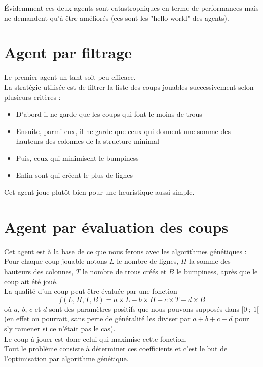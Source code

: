 Évidemment ces deux agents sont catastrophiques en terme de performances mais ne demandent qu'à être améliorés (ces sont les "hello world" des agents).

\section{Agent par filtrage}
Le premier agent un tant soit peu efficace.\\
La stratégie utilisée est de filtrer la liste des coups jouables successivement selon plusieurs critères :
\begin{itemize}
	\item D'abord il ne garde que les coups qui font le moins de trous
	\item Ensuite, parmi eux, il ne garde que ceux qui donnent une somme des hauteurs des colonnes de la structure minimal
	\item Puis, ceux qui minimisent le bumpiness
	\item Enfin sont qui créent le plus de lignes 
\end{itemize} 

Cet agent joue plutôt bien pour une heuristique aussi simple.

\section{Agent par évaluation des coups}
Cet agent est à la base de ce que nous ferons avec les algorithmes génétiques :\\
Pour chaque coup jouable notons $L$ le nombre de lignes, $H$ la somme des hauteurs des colonnes, $T$ le nombre de trous créés et $B$ le bumpiness, après que le coup ait été joué.\\
La qualité d'un coup peut être évaluée par une fonction $$f(L,H,T,B)=a\times L - b\times H - c\times T - d\times B$$
où $a$, $b$, $c$ et $d$ sont des paramètres positifs que nous pouvons supposés dans $[0~;~1[$ (en effet on pourrait, sans perte de généralité les diviser par $a+b+c+d$ pour s'y ramener si ce n'était pas le cas).\\

Le coup à jouer est donc celui qui maximise cette fonction.\\

Tout le problème consiste à déterminer ces coefficients et c'est le but de l'optimisation par algorithme génétique.

